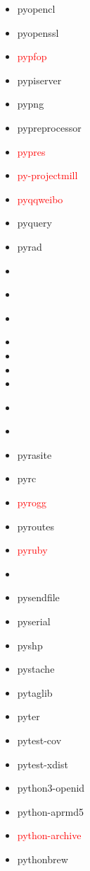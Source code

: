 \documentclass{l4proj}
\begin{document}
\begin{appendices}
{\begin{itemize}
\item pyopencl
\item pyopenssl
\item\textcolor{red}{pypfop}
\item pypiserver
\item pypng
\item pypreprocessor
\item\textcolor{red}{pypres}
\item\textcolor{red}{py-projectmill}
\item\textcolor{red}{pyqqweibo}
\item pyquery
\item pyrad
\item {}
\item\textcolor{red}{}
\item\textcolor{red}{}
\item {}
\item {}
\item {}
\item {}
\item\textcolor{red}{}
\end{itemize}
}%
\noindent\parbox[t]{0.32\textwidth}{\raggedright%
\begin{itemize}
\item\textcolor{red}{}
\item pyrasite
\item pyrc
\item\textcolor{red}{pyrogg}
\item pyroutes
\item\textcolor{red}{pyruby}
\item {}
\item pysendfile
\item pyserial
\item pyshp
\item pystache
\item pytaglib
\item pyter
\item pytest-cov
\item pytest-xdist
\item python3-openid
\item python-aprmd5
\item\textcolor{red}{python-archive}
\item pythonbrew

\end{itemize}}
\end{appendices}
\end{document}
